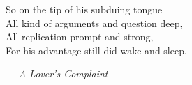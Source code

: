 \epigraph{
	So on the tip of his subduing tongue\\
	All kind of arguments and question deep,\\
	All replication prompt and strong,\\
	For his advantage still did wake and sleep.}
{--- \textit{A Lover's Complaint}} %